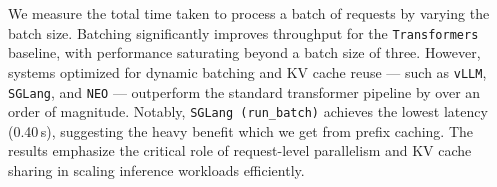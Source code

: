 We measure the total time taken to process a batch of requests by varying the batch size. Batching significantly improves throughput for the \texttt{Transformers} baseline, with performance saturating beyond a batch size of three. However, systems optimized for dynamic batching and KV cache reuse — such as \texttt{vLLM}, \texttt{SGLang}, and \texttt{NEO} — outperform the standard transformer pipeline by over an order of magnitude. Notably, \texttt{SGLang (run\_batch)} achieves the lowest latency (0.40\,s), suggesting the heavy benefit which we get from prefix caching. The results emphasize the critical role of request-level parallelism and KV cache sharing in scaling inference workloads efficiently.


